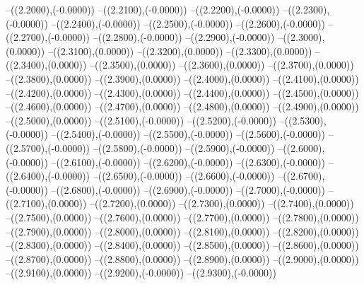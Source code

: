 {	--({\sx*(2.2000)},{\sy*(-0.0000)})
	--({\sx*(2.2100)},{\sy*(-0.0000)})
	--({\sx*(2.2200)},{\sy*(-0.0000)})
	--({\sx*(2.2300)},{\sy*(-0.0000)})
	--({\sx*(2.2400)},{\sy*(-0.0000)})
	--({\sx*(2.2500)},{\sy*(-0.0000)})
	--({\sx*(2.2600)},{\sy*(-0.0000)})
	--({\sx*(2.2700)},{\sy*(-0.0000)})
	--({\sx*(2.2800)},{\sy*(-0.0000)})
	--({\sx*(2.2900)},{\sy*(-0.0000)})
	--({\sx*(2.3000)},{\sy*(0.0000)})
	--({\sx*(2.3100)},{\sy*(0.0000)})
	--({\sx*(2.3200)},{\sy*(0.0000)})
	--({\sx*(2.3300)},{\sy*(0.0000)})
	--({\sx*(2.3400)},{\sy*(0.0000)})
	--({\sx*(2.3500)},{\sy*(0.0000)})
	--({\sx*(2.3600)},{\sy*(0.0000)})
	--({\sx*(2.3700)},{\sy*(0.0000)})
	--({\sx*(2.3800)},{\sy*(0.0000)})
	--({\sx*(2.3900)},{\sy*(0.0000)})
	--({\sx*(2.4000)},{\sy*(0.0000)})
	--({\sx*(2.4100)},{\sy*(0.0000)})
	--({\sx*(2.4200)},{\sy*(0.0000)})
	--({\sx*(2.4300)},{\sy*(0.0000)})
	--({\sx*(2.4400)},{\sy*(0.0000)})
	--({\sx*(2.4500)},{\sy*(0.0000)})
	--({\sx*(2.4600)},{\sy*(0.0000)})
	--({\sx*(2.4700)},{\sy*(0.0000)})
	--({\sx*(2.4800)},{\sy*(0.0000)})
	--({\sx*(2.4900)},{\sy*(0.0000)})
	--({\sx*(2.5000)},{\sy*(0.0000)})
	--({\sx*(2.5100)},{\sy*(-0.0000)})
	--({\sx*(2.5200)},{\sy*(-0.0000)})
	--({\sx*(2.5300)},{\sy*(-0.0000)})
	--({\sx*(2.5400)},{\sy*(-0.0000)})
	--({\sx*(2.5500)},{\sy*(-0.0000)})
	--({\sx*(2.5600)},{\sy*(-0.0000)})
	--({\sx*(2.5700)},{\sy*(-0.0000)})
	--({\sx*(2.5800)},{\sy*(-0.0000)})
	--({\sx*(2.5900)},{\sy*(-0.0000)})
	--({\sx*(2.6000)},{\sy*(-0.0000)})
	--({\sx*(2.6100)},{\sy*(-0.0000)})
	--({\sx*(2.6200)},{\sy*(-0.0000)})
	--({\sx*(2.6300)},{\sy*(-0.0000)})
	--({\sx*(2.6400)},{\sy*(-0.0000)})
	--({\sx*(2.6500)},{\sy*(-0.0000)})
	--({\sx*(2.6600)},{\sy*(-0.0000)})
	--({\sx*(2.6700)},{\sy*(-0.0000)})
	--({\sx*(2.6800)},{\sy*(-0.0000)})
	--({\sx*(2.6900)},{\sy*(-0.0000)})
	--({\sx*(2.7000)},{\sy*(-0.0000)})
	--({\sx*(2.7100)},{\sy*(0.0000)})
	--({\sx*(2.7200)},{\sy*(0.0000)})
	--({\sx*(2.7300)},{\sy*(0.0000)})
	--({\sx*(2.7400)},{\sy*(0.0000)})
	--({\sx*(2.7500)},{\sy*(0.0000)})
	--({\sx*(2.7600)},{\sy*(0.0000)})
	--({\sx*(2.7700)},{\sy*(0.0000)})
	--({\sx*(2.7800)},{\sy*(0.0000)})
	--({\sx*(2.7900)},{\sy*(0.0000)})
	--({\sx*(2.8000)},{\sy*(0.0000)})
	--({\sx*(2.8100)},{\sy*(0.0000)})
	--({\sx*(2.8200)},{\sy*(0.0000)})
	--({\sx*(2.8300)},{\sy*(0.0000)})
	--({\sx*(2.8400)},{\sy*(0.0000)})
	--({\sx*(2.8500)},{\sy*(0.0000)})
	--({\sx*(2.8600)},{\sy*(0.0000)})
	--({\sx*(2.8700)},{\sy*(0.0000)})
	--({\sx*(2.8800)},{\sy*(0.0000)})
	--({\sx*(2.8900)},{\sy*(0.0000)})
	--({\sx*(2.9000)},{\sy*(0.0000)})
	--({\sx*(2.9100)},{\sy*(0.0000)})
	--({\sx*(2.9200)},{\sy*(-0.0000)})
	--({\sx*(2.9300)},{\sy*(-0.0000)})
}
